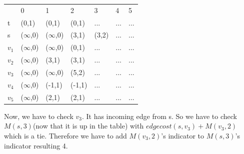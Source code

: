 \documentclass[a4paper,11pt]{article}
\begin{document}
\begin{enumerate}
\begin{center}
\begin{tabular}{lllllll}
                       & 0                         & 1                     & 2                     & 3                     & 4                     & 5                     \\ \cline{2-7} 
\multicolumn{1}{l|}{t} & \multicolumn{1}{l|}{(0,1)} & \multicolumn{1}{l|}{(0,1)} & \multicolumn{1}{l|}{(0,1)} & \multicolumn{1}{l|}{...} & \multicolumn{1}{l|}{...} & \multicolumn{1}{l|}{...} \\ \cline{2-7} 
\multicolumn{1}{l|}{s} & \multicolumn{1}{l|}{($\infty$,0)} & \multicolumn{1}{l|}{($\infty$,0)} & \multicolumn{1}{l|}{(3,1)} & \multicolumn{1}{l|}{(3,2)} & \multicolumn{1}{l|}{...} & \multicolumn{1}{l|}{...} \\ \cline{2-7} 
\multicolumn{1}{l|}{$v_1$} & \multicolumn{1}{l|}{($\infty$,0)} & \multicolumn{1}{l|}{($\infty$,0)} & \multicolumn{1}{l|}{(0,1)} & \multicolumn{1}{l|}{...} & \multicolumn{1}{l|}{...} & \multicolumn{1}{l|}{...} \\ \cline{2-7} 
\multicolumn{1}{l|}{$v_2$} & \multicolumn{1}{l|}{($\infty$,0)} & \multicolumn{1}{l|}{(3,1)} & \multicolumn{1}{l|}{(3,1)} & \multicolumn{1}{l|}{...} & \multicolumn{1}{l|}{...} & \multicolumn{1}{l|}{...} \\ \cline{2-7} 
\multicolumn{1}{l|}{$v_3$} & \multicolumn{1}{l|}{($\infty$,0)} & \multicolumn{1}{l|}{($\infty$,0)} & \multicolumn{1}{l|}{(5,2)} & \multicolumn{1}{l|}{...} & \multicolumn{1}{l|}{...} & \multicolumn{1}{l|}{...} \\ \cline{2-7} 
\multicolumn{1}{l|}{$v_4$} & \multicolumn{1}{l|}{($\infty$,0)} & \multicolumn{1}{l|}{(-1,1)} & \multicolumn{1}{l|}{(-1,1)} & \multicolumn{1}{l|}{...} & \multicolumn{1}{l|}{...} & \multicolumn{1}{l|}{...} \\ \cline{2-7}  
\multicolumn{1}{l|}{$v_5$} & \multicolumn{1}{l|}{($\infty$,0)} & \multicolumn{1}{l|}{(2,1)} & \multicolumn{1}{l|}{(2,1)} & \multicolumn{1}{l|}{...} & \multicolumn{1}{l|}{...} & \multicolumn{1}{l|}{...} \\ \cline{2-7} 
\end{tabular}
\end{center}

Now, we have to check $v_3$. It has incoming edge from s. So we have to check $M(s,3)$(now that it is up in the table) with $edgecost(s,v_3)+M(v_3,2)$ which is a tie. Therefore we have to add $M(v_3,2)$'s indicator to $M(s,3)$'s indicator resulting 4.


\end{enumerate}
\end{document}
